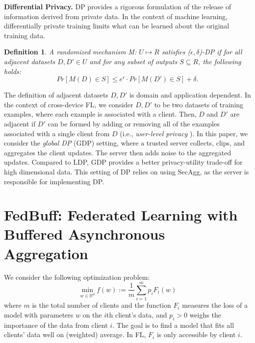 \documentclass[twoside]{article}
\newtheorem{definition}{Definition}
\newcommand{\algname}{{FedBuff}\xspace}
\begin{document}
\textbf{Differential Privacy.}
DP \citep{dp} provides a rigorous formulation of the release of information derived from private data. In the context of machine learning, differentially private training \citep{dp-sgd} limits what can be learned about the original training data. 
\begin{definition}
    A randomized mechanism M: $U \mapsto R$ satisfies ($\epsilon, \delta$)-DP if for all adjacent datasets $D, D' \in U$ and for any subset of outputs $S \subseteq R$, the following holds:
    \[
    Pr[M(D) \in S] \leq e^{\epsilon} \cdot Pr[M(D') \in S] + \delta.
    \]
\end{definition}
The definition of adjacent datasets $D,D'$ is domain and application dependent. In the context of cross-device FL, we consider $D,D'$ to be two datasets of training examples, where each example is associated with a client. Then, $D$ and $D'$ are adjacent if $D'$ can be formed by adding or removing all of the examples associated with a single client from $D$ (i.e., \textit{user-level privacy} \citep{google-dp-fl}). In this paper, we consider the \emph{global DP} (GDP) setting, where a trusted server collects, clips, and aggregates the client updates. The server then adds noise to the aggregated updates. Compared to LDP, GDP provides a better privacy-utility trade-off for high dimensional data. This setting of DP relies on using SecAgg, as the server is responsible for implementing DP.


\section{\algname{}: Federated Learning with Buffered Asynchronous Aggregation}
\label{sec:alg}
We consider the following optimization problem:
\begin{equation}
    \min_{w \in \mathbb{R}^d} f(w) := \frac{1}{m} \sum_{i=1}^m p_i F_i(w)
\end{equation}
where $m$ is the total number of clients and the function $F_i$ measures the loss of a model with parameters $w$ on the $i$th client's data, and $p_i > 0$ weighs the importance of the data from client $i$. The goal is to find a model that fits all clients' data well on (weighted) average. In FL, $F_i$ is only accessible by client $i$. 
\end{document}
